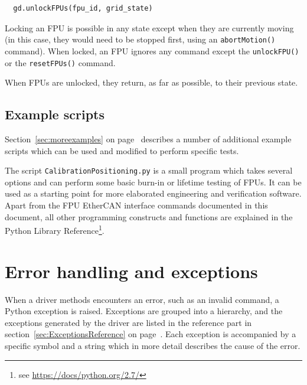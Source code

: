 \documentclass[fontsize=12,a4paper]{scrreprt}
\begin{document}
\begin{verbatim}
  gd.unlockFPUs(fpu_id, grid_state)
\end{verbatim}

Locking an FPU is possible in any state except when they are currently
moving (in this case, they would need to be stopped first, using an
\texttt{abortMotion()} command). When locked, an FPU ignores any
command except the \texttt{unlockFPU()} or the \texttt{resetFPUs()}
command.

When FPUs are unlocked, they return, as far as possible, to their
previous state.




\section{Example scripts}

Section~\ref{sec:moreexamples} on page~\pageref{sec:moreexamples}
describes a number of additional example scripts which can be used and
modified to perform specific tests.

The script \texttt{CalibrationPositioning.py} is a small program which
takes several options and can perform some basic burn-in or lifetime
testing of FPUs. It can be used as a starting point for more
elaborated engineering and verification software. Apart from the FPU
EtherCAN interface commands documented in this document, all other programming
constructs and functions are explained in the Python Library
Reference\footnote{see \url{https://docs/python.org/2.7/}}.



\chapter{Error handling and exceptions}
\label{sec:errorhandling}
When a driver methods encounters an error, such as an invalid command,
a Python exception is raised. Exceptions are grouped into a hierarchy,
and the exceptions generated by the driver are listed in the reference
part in section~\ref{sec:ExceptionsReference} on
page~\pageref{sec:ExceptionsReference}. Each exception is accompanied
by a specific symbol and a string which in more detail describes the
cause of the error.
\end{document}
